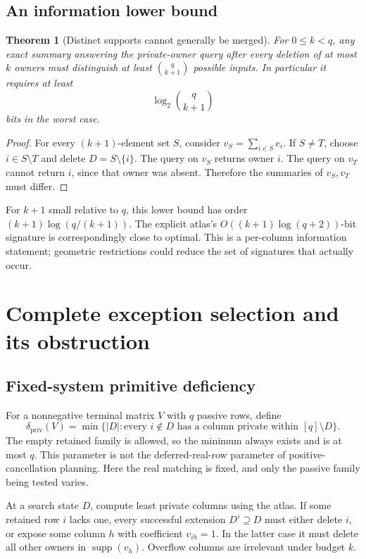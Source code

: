 \documentclass[11pt,letterpaper]{article}
\newtheorem{theorem}{Theorem}[section]
\theoremstyle{definition}
\newcommand{\supp}{\operatorname{supp}}
\newcommand{\dpriv}{\delta_{\mathrm{priv}}}
\begin{document}
\subsection{An information lower bound}
\begin{theorem}[Distinct supports cannot generally be merged]\label{thm:atlaslower}
For $0\le k<q$, any exact summary answering the private-owner query after every deletion of at most $k$ owners must distinguish at least $\binom{q}{k+1}$ possible inputs. In particular it requires at least
\[
 \log_2\binom{q}{k+1}
\]
bits in the worst case.
\end{theorem}
\begin{proof}
For every $(k+1)$-element set $S$, consider $v_S=\sum_{i\in S}e_i$. If $S\ne T$, choose $i\in S\setminus T$ and delete $D=S\setminus\{i\}$. The query on $v_S$ returns owner $i$. The query on $v_T$ cannot return $i$, since that owner was absent. Therefore the summaries of $v_S,v_T$ must differ.
\end{proof}

For $k+1$ small relative to $q$, this lower bound has order $(k+1)\log(q/(k+1))$. The explicit atlas's $O((k+1)\log(q+2))$-bit signature is correspondingly close to optimal. This is a per-column information statement; geometric restrictions could reduce the set of signatures that actually occur.

\section{Complete exception selection and its obstruction}
\subsection{Fixed-system primitive deficiency}
For a nonnegative terminal matrix $V$ with $q$ passive rows, define
\[
 \dpriv(V)=\min\bigl\{|D|:\text{every }i\notin D\text{ has a column private within }[q]\setminus D\bigr\}.
\]
The empty retained family is allowed, so the minimum always exists and is at most $q$. This parameter is not the deferred-real-row parameter of positive-cancellation planning. Here the real matching is fixed, and only the passive family being tested varies.

At a search state $D$, compute least private columns using the atlas. If some retained row $i$ lacks one, every successful extension $D'\supseteq D$ must either delete $i$, or expose some column $h$ with coefficient $v_{ih}=1$. In the latter case it must delete all other owners in $\supp(v_h)$. Overflow columns are irrelevant under budget $k$.
\end{document}
